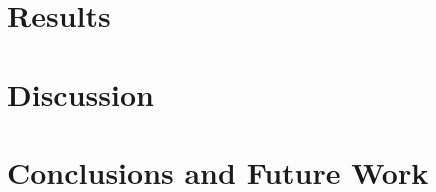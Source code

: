 \section{Results} \label{sec:results}


\section{Discussion} \label{sec:discussion}



\section{Conclusions and Future Work} \label{sec:conclusion}


\label{endofmain}
\clearpage %
\printbibliography[title={References},heading=bibintoc] %



